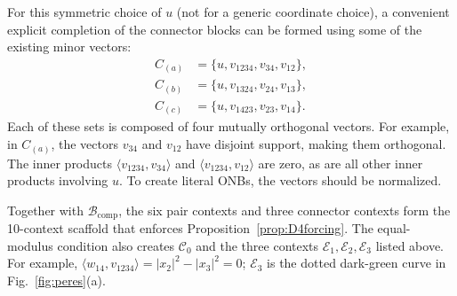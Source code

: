 \documentclass[%
  reprint,
  superscriptaddress,
  showpacs,
  showkeys,
  amsmath,amssymb,
  pra,
  longbibliography,
  floatfix,
  x11names
]{revtex4-2}
\newcommand{\rev}[1]{{\color{revisionblue}#1}}
\begin{document}
\rev{For this symmetric choice of $u$ (not for a generic coordinate choice), a convenient explicit completion of the connector blocks can be formed using some of the existing minor vectors:}
\begin{align*}
C_{(a)}&=\{u, v_{1234}, v_{34}, v_{12}\},\\
C_{(b)}&=\{u, v_{1324}, v_{24}, v_{13}\},\\
C_{(c)}&=\{u, v_{1423}, v_{23}, v_{14}\}.
\end{align*}
Each of these sets is composed of four mutually orthogonal vectors. For example, in $C_{(a)}$, the vectors $v_{34}$ and $v_{12}$ have disjoint support,
making them orthogonal. The inner products $\langle v_{1234}, v_{34} \rangle$ and $\langle v_{1234}, v_{12} \rangle$ are zero, as are all other inner products involving $u$. To create literal ONBs, the vectors should be normalized.

\rev{Together with $\mathcal{B}_{\mathrm{comp}}$, the six pair contexts and three connector contexts form the 10-context scaffold that enforces Proposition~\ref{prop:D4forcing}.  The equal-modulus condition also creates $\mathcal{C}_0$ and the three contexts $\mathcal{E}_1,\mathcal{E}_2,\mathcal{E}_3$ listed above.  For example, $\langle w_{14},v_{1234}\rangle=|x_2|^2-|x_3|^2=0$; $\mathcal{E}_3$ is the dotted dark-green curve in Fig.~\ref{fig:peres}(a).}
\end{document}

